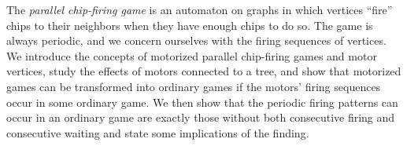 The \emph{parallel chip-firing game} is an automaton on graphs in which
vertices ``fire'' chips to their neighbors when they have enough chips to do
so. The game is always periodic, and we concern ourselves with the firing
sequences of vertices. We introduce the concepts of motorized parallel
chip-firing games and motor vertices, study the effects of motors connected to
a tree, and show that motorized games can be transformed into ordinary games if
the motors' firing sequences occur in some ordinary game. We then show that the
periodic firing patterns can occur in an ordinary game are exactly those
without both consecutive firing and consecutive waiting and state some
implications of the finding.

